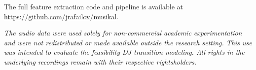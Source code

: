 \documentclass{article}
\begin{document}
The full feature extraction code and pipeline is available at \url{https://github.com/jrafailov/musikal}.

\textit{The audio data were used solely for non-commercial academic experimentation and were not redistributed or made available outside the research setting. This use was intended to evaluate the feasibility DJ-transition modeling. All rights in the underlying recordings remain with their respective rightsholders.}

\setlength{\bibsep}{1pt plus 0.3ex}











\end{document}
